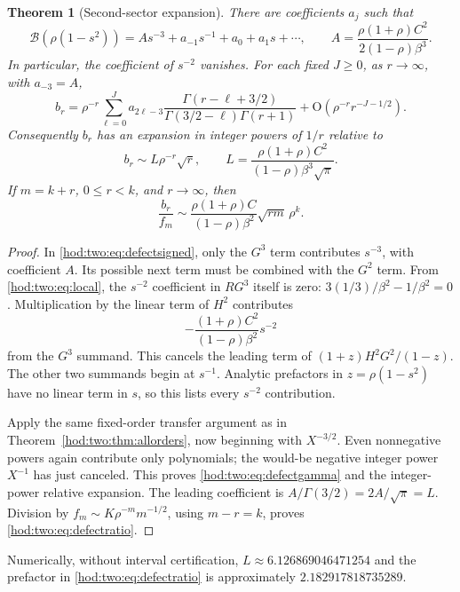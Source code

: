 \documentclass[11pt,letterpaper]{article}
\newtheorem{theorem}{Theorem}[section]
\theoremstyle{definition}\newtheorem{definition}[theorem]{Definition}
\theoremstyle{remark}\newtheorem{remark}[theorem]{Remark}
\newcommand{\Bcal}{\mathcal B}
\newcommand{\bigO}{\mathrm O}
\begin{document}
\begin{theorem}[Second-sector expansion]\label{hod:two:thm:defectasym}
There are coefficients $a_j$ such that
\begin{equation}\label{hod:two:eq:defectjet}
\Bcal(\rho(1-s^2))=A s^{-3}+a_{-1}s^{-1}+a_0+a_1s+\cdots,
\qquad
A=\frac{\rho(1+\rho)C^2}{2(1-\rho)\beta^3}.
\end{equation}
In particular, the coefficient of $s^{-2}$ vanishes. For each fixed $J\ge0$, as $r\to\infty$, with $a_{-3}=A$,
\begin{equation}\label{hod:two:eq:defectgamma}
b_r=\rho^{-r}\sum_{\ell=0}^Ja_{2\ell-3}
\frac{\Gamma(r-\ell+3/2)}{\Gamma(3/2-\ell)\Gamma(r+1)}
+\bigO(\rho^{-r}r^{-J-1/2}).
\end{equation}
Consequently $b_r$ has an expansion in integer powers of $1/r$ relative to
\begin{equation}\label{hod:two:eq:defectlead}
b_r\sim L\rho^{-r}\sqrt r,\qquad
L=\frac{\rho(1+\rho)C^2}{(1-\rho)\beta^3\sqrt\pi}.
\end{equation}
If $m=k+r$, $0\le r<k$, and $r\to\infty$, then
\begin{equation}\label{hod:two:eq:defectratio}
\frac{b_r}{f_m}\sim
\frac{\rho(1+\rho)C}{(1-\rho)\beta^2}\sqrt{rm}\,\rho^k.
\end{equation}
\end{theorem}
\begin{proof}
In \eqref{hod:two:eq:defectsigned}, only the $G^3$ term contributes $s^{-3}$, with coefficient $A$. Its possible next term must be combined with the $G^2$ term. From \eqref{hod:two:eq:local}, the $s^{-2}$ coefficient in $RG^3$ itself is zero: $3(1/3)/\beta^2-1/\beta^2=0$. Multiplication by the linear term of $H^2$ contributes
\[
-\frac{(1+\rho)C^2}{(1-\rho)\beta^2}s^{-2}
\]
from the $G^3$ summand. This cancels the leading term of $(1+z)H^2G^2/(1-z)$. The other two summands begin at $s^{-1}$. Analytic prefactors in $z=\rho(1-s^2)$ have no linear term in $s$, so this lists every $s^{-2}$ contribution.

Apply the same fixed-order transfer argument as in Theorem~\ref{hod:two:thm:allorders}, now beginning with $X^{-3/2}$. Even nonnegative powers again contribute only polynomials; the would-be negative integer power $X^{-1}$ has just canceled. This proves \eqref{hod:two:eq:defectgamma} and the integer-power relative expansion. The leading coefficient is $A/\Gamma(3/2)=2A/\sqrt\pi=L$. Division by $f_m\sim K\rho^{-m}m^{-1/2}$, using $m-r=k$, proves \eqref{hod:two:eq:defectratio}.
\end{proof}
Numerically, without interval certification, $L\approx6.126869046471254$ and the prefactor in \eqref{hod:two:eq:defectratio} is approximately $2.182917818735289$.
\end{document}
